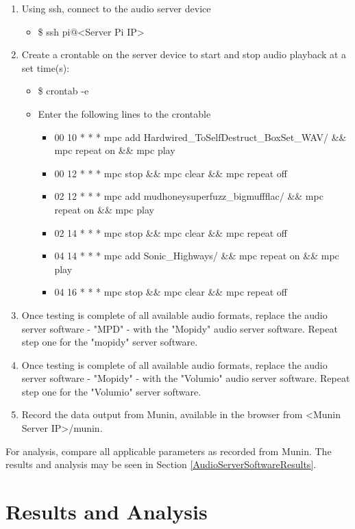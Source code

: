 \documentclass[11pt,a4paper]{scrreprt}
\begin{document}
\begin{enumerate}
  \item Using ssh, connect to the audio server device
  \begin{itemize}
    \item \$ ssh pi@<Server Pi IP>
  \end{itemize}
  \item Create a crontable on the server device to start and stop audio playback
  at a set time(s):
  \begin{itemize}
    \item \$ crontab -e
    \item Enter the following lines to the crontable
    \begin{itemize}
     \item 00 10 * * * mpc add Hardwired\_To\textendash{}Self\textendash{}Destruct\_BoxSet\_WAV/ \&\& mpc repeat on \&\& mpc play
     \item 00 12 * * * mpc stop \&\& mpc clear \&\& mpc repeat off
     \item 02 12 * * * mpc add
     mudhoney\textendash{}superfuzz\_bigmuff\textendash{}flac/ \&\& mpc repeat on \&\& mpc play
     \item 02 14 * * * mpc stop \&\& mpc clear \&\& mpc repeat off
     \item 04 14 * * * mpc add Sonic\_Highways/ \&\& mpc repeat on \&\& mpc play
     \item 04 16 * * * mpc stop \&\& mpc clear \&\& mpc repeat off
   \end{itemize}
  \end{itemize}
  \item Once testing is complete of all available audio formats, replace the audio
   server software - "MPD" - with the "Mopidy" audio server software. Repeat step
   one for the "mopidy" server software.
  \item Once testing is complete of all available audio formats, replace the audio
   server software - "Mopidy" - with the "Volumio" audio server software. Repeat
   step one for the "Volumio" server software.
  \item Record the data output from Munin, available in the browser from <Munin
  Server IP>/munin.
\end{enumerate}

For analysis, compare all applicable parameters as recorded from Munin.
The results and analysis may be seen in Section
\ref{AudioServerSoftwareResults}.

\chapter{Results and Analysis}\label{results-and-analysis}
\end{document}
